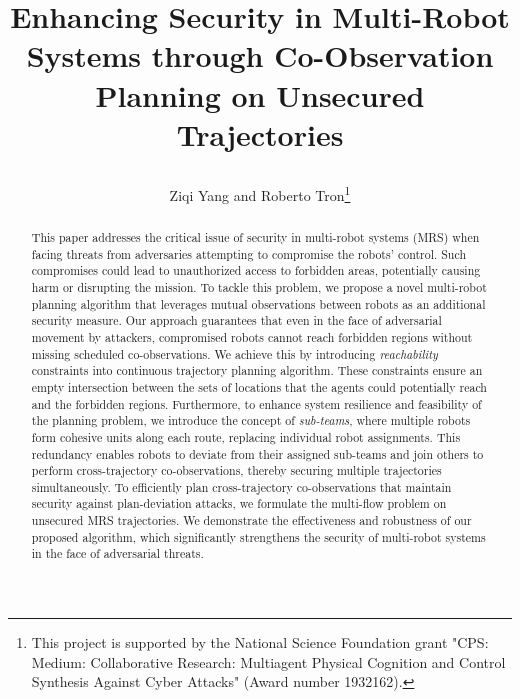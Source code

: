 \documentclass[journal]{IEEEtran}  %
\title{\LARGE \bf

Enhancing Security in Multi-Robot Systems through Co-Observation Planning on Unsecured Trajectories}
\author{Ziqi Yang and Roberto Tron\thanks{This project is supported by the National Science Foundation grant "CPS: Medium: Collaborative Research: Multiagent Physical Cognition and Control Synthesis Against Cyber Attacks" (Award number 1932162).}}
\begin{document}
\maketitle
\thispagestyle{empty}
\pagestyle{empty}




\begin{abstract}
This paper addresses the critical issue of security in multi-robot systems (MRS) when facing threats from adversaries attempting to compromise the robots' control. Such compromises could lead to unauthorized access to forbidden areas, potentially causing harm or disrupting the mission. To tackle this problem, we propose a novel multi-robot planning algorithm that leverages mutual observations between robots as an additional security measure. Our approach guarantees that even in the face of adversarial movement by attackers, compromised robots cannot reach forbidden regions without missing scheduled co-observations. 
We achieve this by introducing \emph{reachability} constraints into continuous trajectory planning algorithm. These constraints ensure an empty intersection between the sets of locations that the agents could potentially reach and the forbidden regions. 
Furthermore, to enhance system resilience and feasibility of the planning problem, we introduce the concept of \emph{sub-teams}, where multiple robots form cohesive units along each route, replacing individual robot assignments. This redundancy enables robots to deviate from their assigned sub-teams and join others to perform cross-trajectory co-observations, thereby securing multiple trajectories simultaneously. To efficiently plan cross-trajectory co-observations that maintain security against plan-deviation attacks, we formulate the multi-flow problem on unsecured MRS trajectories. 
We demonstrate the effectiveness and robustness of our proposed algorithm, which significantly strengthens the security of multi-robot systems in the face of adversarial threats.
\end{abstract}
\end{document}
